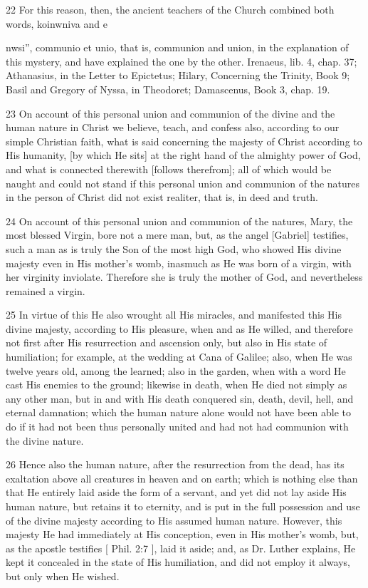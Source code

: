 22 For this reason, then, the ancient teachers of the Church combined both words, koinwniva and e{nwsi”, communio et unio, that is, communion and union, in the explanation of this mystery, and have explained the one by the other. Irenaeus, lib. 4, chap. 37; Athanasius, in the Letter to Epictetus; Hilary, Concerning the Trinity, Book 9; Basil and Gregory of Nyssa, in Theodoret; Damascenus, Book 3, chap. 19.

23 On account of this personal union and communion of the divine and the human nature in Christ we believe, teach, and confess also, according to our simple Christian faith, what is said concerning the majesty of Christ according to His humanity, [by which He sits] at the right hand of the almighty power of God, and what is connected therewith [follows therefrom]; all of which would be naught and could not stand if this personal union and communion of the natures in the person of Christ did not exist realiter, that is, in deed and truth.

24 On account of this personal union and communion of the natures, Mary, the most blessed Virgin, bore not a mere man, but, as the angel [Gabriel] testifies, such a man as is truly the Son of the most high God, who showed His divine majesty even in His mother’s womb, inasmuch as He was born of a virgin, with her virginity inviolate. Therefore she is truly the mother of God, and nevertheless remained a virgin.

25 In virtue of this He also wrought all His miracles, and manifested this His divine majesty, according to His pleasure, when and as He willed, and therefore not first after His resurrection and ascension only, but also in His state of humiliation; for example, at the wedding at Cana of Galilee; also, when He was twelve years old, among the learned; also in the garden, when with a word He cast His enemies to the ground; likewise in death, when He died not simply as any other man, but in and with His death conquered sin, death, devil, hell, and eternal damnation; which the human nature alone would not have been able to do if it had not been thus personally united and had not had communion with the divine nature.

26 Hence also the human nature, after the resurrection from the dead, has its exaltation above all creatures in heaven and on earth; which is nothing else than that He entirely laid aside the form of a servant, and yet did not lay aside His human nature, but retains it to eternity, and is put in the full possession and use of the divine majesty according to His assumed human nature. However, this majesty He had immediately at His conception, even in His mother’s womb, but, as the apostle testifies [ Phil. 2:7 ], laid it aside; and, as Dr. Luther explains, He kept it concealed in the state of His humiliation, and did not employ it always, but only when He wished.

}
